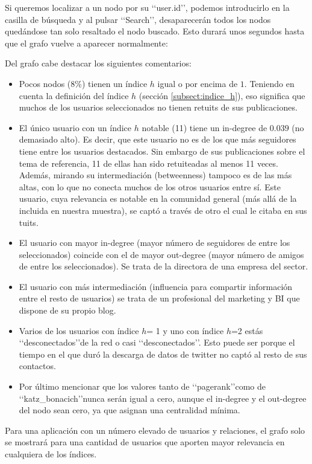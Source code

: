 Si queremos localizar a un nodo por su \lq\lq user.id\rq\rq, podemos introducirlo en la
casilla de búsqueda y al pulsar \lq\lq Search\rq\rq, desaparecerán todos los nodos 
quedándose tan solo resaltado el nodo buscado. 
Esto durará unos segundos hasta que el grafo vuelve a aparecer normalmente:


Del grafo cabe destacar los siguientes comentarios:
\begin{itemize}
\item Pocos nodos ($8$\%) tienen un índice $h$ igual o por encima de $1$. Teniendo en cuenta 
la definición del índice $h$ (sección \ref{subsect:indice_h}), eso significa que muchos de los 
usuarios seleccionados no tienen retuits de sus publicaciones.

\item El único usuario con un índice $h$ notable (11) tiene un in-degree de $0.039$ (no demasiado alto). 
Es decir, que este usuario no es de los que más seguidores tiene entre los usuarios destacados. Sin
embargo de sus publicaciones sobre el tema de referencia, 11 de ellas han sido retuiteadas al menos
11 veces. Además, mirando su intermediación (betweenness) tampoco es de las más altas, con lo que 
no conecta muchos de los otros usuarios entre sí. Este usuario, cuya relevancia es notable en la comunidad
general (más allá de la incluida en nuestra muestra), se captó a través de otro el cual le citaba en 
sus tuits. 


\item El usuario con mayor in-degree (mayor número de seguidores de entre los seleccionados) coincide 
con el de mayor out-degree (mayor número de amigos de entre los seleccionados). Se trata de la 
directora de una empresa del sector. 

\item El usuario con más intermediación (influencia para compartir información entre el resto de usuarios) se trata de un profesional del marketing y BI que dispone de su propio blog.


\item Varios de los usuarios con índice $h$= 1 y uno con índice $h$=2 estás \lq\lq desconectados\rq\rq de la red o casi \lq\lq desconectados\rq\rq. Esto puede ser porque el tiempo en el que duró la descarga de datos de twitter no captó al resto de sus contactos.


\item Por último mencionar que los valores tanto de \lq\lq pagerank\rq\rq como de
\lq\lq katz\_bonacich\rq\rq nunca serán igual a cero, aunque el in-degree y el out-degree del nodo 
sean cero, ya que asignan una centralidad mínima.
\end{itemize}

Para una aplicación con un número elevado de usuarios y relaciones, 
el grafo solo se mostrará para una cantidad de usuarios que aporten 
mayor relevancia en cualquiera de los índices.